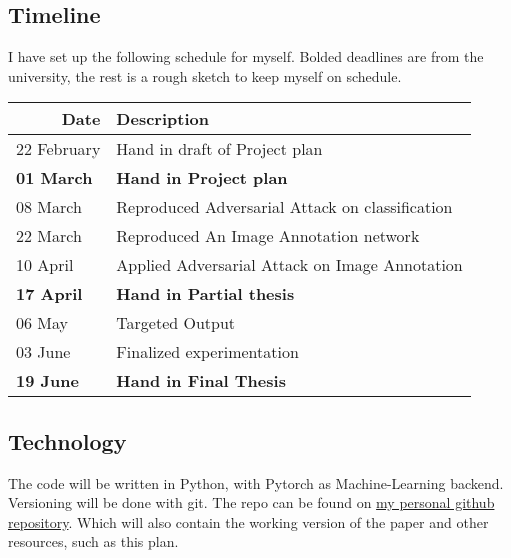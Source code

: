 \documentclass[12pt]{extarticle}
\begin{document}
\subsection{Timeline}
I have set up the following schedule for myself. Bolded deadlines are from the university, the rest is a rough sketch to keep myself on schedule.
\begin{table}[h]
    \begin{tabular}{|l|l|}
        \hline
        \multicolumn{1}{|r|}{Date} & Description                                     \\ \hline
        22 February                & Hand in draft of Project plan                   \\ \hline
        \textbf{01 March}          & \textbf{Hand in Project plan}                   \\ \hline
        08 March                   & Reproduced Adversarial Attack on classification \\ \hline
        22 March                   & Reproduced An Image Annotation network          \\ \hline
        10 April                   & Applied Adversarial Attack on Image Annotation  \\ \hline
        \textbf{17 April}          & \textbf{Hand in Partial thesis}                 \\ \hline
        06 May                     & Targeted Output                                 \\ \hline
        03 June                    & Finalized experimentation                       \\ \hline
        \textbf{19 June}           & \textbf{Hand in Final Thesis}                   \\ \hline
    \end{tabular}
\end{table}


\subsection{Technology}
The code will be written in Python, with Pytorch as Machine-Learning backend. Versioning will be done with git. The repo can be found on \href{https://github.com/dikvangenuchten/bep-adversarial-image-annotation}{my personal github repository}. Which will also contain the working version of the paper and other resources, such as this plan.




\end{document}
